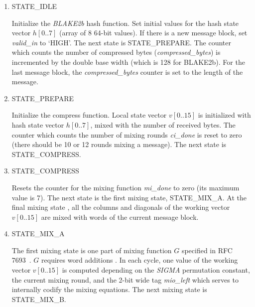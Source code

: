 \documentclass[%
	a4paper,
]
{article}
\newcommand{\done}[1]{}
\begin{document}
\begin{enumerate}

	\item STATE_IDLE

		Initialize the \emph{BLAKE2b} hash function. Set initial values for the
		hash state vector $h[0..7]$ (array of 8 64-bit values). \done{If used as a
		hash function, use the pre-defined set of prime numbers' square roots.
		If used as a \gls{mac}, use a secret key instead, which is provided as
		input to the function.}
%
		If there is a new message block, set \emph{valid\_in} to
		`HIGH'. The next state is \mbox{STATE_PREPARE}. The counter which counts the
		number of compressed bytes (\emph{compressed\_bytes}) is incremented by
		the double base width (which is 128 for BLAKE2b). For the last message block,
		the \emph{compressed\_bytes} counter is set to the length of the message.

	\item STATE_PREPARE

		Initialize the compress function. Local state vector $v[0..15]$ is initialized
		with hash state vector $h[0..7]$, mixed with the number of received bytes.
		The counter which counts the number of mixing rounds \emph{ci_done} is reset
		to zero (there should be 10 or 12 rounds mixing a message). The next state is
		\mbox{STATE_COMPRESS}.

	\item STATE_COMPRESS

		Resets the counter for the mixing	function \emph{mi_done} to zero (its
		maximum	value is 7). The next state is the first mixing state,
		\mbox{STATE_MIX_A}. At the final mixing state \done{(which one is it? This
		is not quite clear to me...)},
		all the columns and diagonals of the working vector $v[0..15]$ are
		mixed with words of the current message block.

	\item STATE_MIX_A

		The first mixing state is one part of mixing function $G$ specified in
		RFC 7693~\autocite[7]{rfc7693}. $G$ requires word additions \done{(Does
		it mean to add words, or to perform the arithmetic operation `addition' on
		words?)}. In each cycle, one value of the working vector $v[0..15]$
		is computed depending on the \emph{SIGMA} permutation constant, the current
		mixing round, and the  2-bit wide tag \emph{mio_left} which serves
		to internally codify the mixing equations. The next mixing state is
		\mbox{STATE_MIX_B}.


\end{enumerate}
\end{document}
